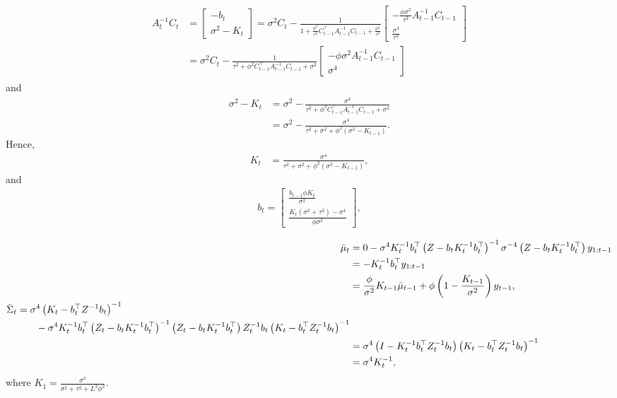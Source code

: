 \begin{align}
\begin{split}
A_{t}^{-1}C_{t} &= \left[ \begin{array}{c} -b_{t} \\ \sigma^2-K_{t}\end{array} \right] = \sigma^2C_{t}-\frac{1}{1+\frac{\phi^2}{\tau^2} C_{t-1}^\top A_{t-1}^{-1}C_{t-1}+\frac{\sigma^2}{\tau^2}} \left[\begin{array}{c} -\frac{\phi\sigma^2}{\tau^2} A_{t-1}^{-1}C_{t-1} \\\frac{\sigma^4}{\tau^2} \end{array}\right] \\
&= \sigma^2C_{t}-\frac{1}{\tau^2+\phi^2C_{t-1}^\top A_{t-1}^{-1}C_{t-1}+\sigma^2} \left[\begin{array}{c} -\phi\sigma^2 A_{t-1}^{-1}C_{t-1} \\ \sigma^4 \end{array}\right]
\end{split}
\end{align}
and
\begin{align*}
\sigma^2-K_{t} &= \sigma^2 - \frac{\sigma^4}{\tau^2+\phi^2C_{t-1}^\top A_{t-1}^{-1}C_{t-1}+\sigma^2} \\
&= \sigma^2 - \frac{\sigma^4}{\tau^2+ \sigma^2 + \phi^2\left(\sigma^2-K_{t-1}\right)}.
\end{align*}
Hence, 
\begin{align}
K_{t}  &=\frac{\sigma^4}{\tau^2+\sigma^2+\phi^2\left(\sigma^2-K_{t-1}\right)},
\end{align}
and
\begin{align*}b_{t} = 
\begin{bmatrix}
\frac{b_{t-1}\phi K_{t}}{\sigma^2} \\ \frac{K_{t}\left(\sigma^2+\tau^2\right)-\sigma^4 }{\phi\sigma^2}
\end{bmatrix},
\end{align*}

\begin{align*}
\bar{\mu}_{t}      &= 0-\sigma^4 K_t^{-1}b_t^\top \left(Z-b_tK_t^{-1}b_t^\top\right)^{-1} \sigma^{-4} \left(Z-b_tK_t^{-1}b_t^\top\right) y_{1:t-1} \\
					 & =-K_t^{-1}b_t^\top y_{1:t-1} \\
					 & = \frac{\phi}{\sigma^2}K_{t-1}\bar{\mu}_{t-1} + \phi \left(1 - \frac{K_{t-1}}{\sigma^2}\right)y_{t-1}, \\
\begin{split}
\bar{\Sigma}_{t} &= \sigma^4\left(K_t-b_t^\top Z^{-1}b_t\right)^{-1}\\ 
&\hphantom{+t-} - \sigma^4K_t^{-1}b_t^\top \left(Z_t-b_tK_t^{-1}b_t^\top\right)^{-1} 
 \left(Z_t-b_tK_t^{-1}b_t^\top\right)Z_t^{-1}b_t\left(K_t-b_t^\top Z_t^{-1}b_t\right)^{-1}
\end{split}
\\  & = \sigma^4\left(I-K_t^{-1}b_t^\top Z_t^{-1}b_t\right)\left(K_t-b_t^\top Z_t^{-1}b_t\right)^{-1} \\
                     & = \sigma^4K_{t}^{-1},
\end{align*}
where $K_1=\frac{\sigma^4}{\sigma^2+\tau^2+L^2\phi^2}$.



